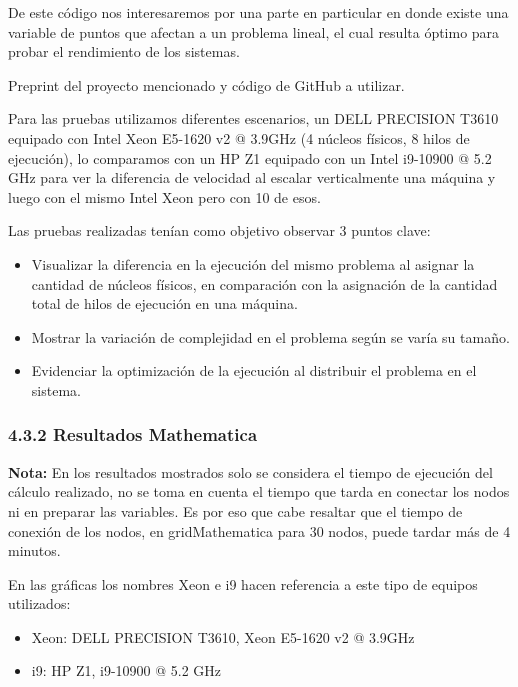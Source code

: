 \begin{spacing}{1.5}
  De este código nos interesaremos por una parte en particular en donde existe una variable de puntos que afectan a un problema lineal, el cual resulta óptimo para probar el rendimiento de los sistemas.

  Preprint del proyecto mencionado y código de GitHub a utilizar. \cite{preprint} \cite{git}

  Para las pruebas utilizamos diferentes escenarios, un DELL PRECISION T3610 equipado con Intel Xeon E5-1620 v2 @ 3.9GHz (4 núcleos físicos, 8 hilos de ejecución), lo comparamos con un HP Z1 equipado con un Intel i9-10900 @ 5.2 GHz para ver la diferencia de velocidad al escalar verticalmente una máquina y luego con el mismo Intel Xeon pero con 10 de esos.

  Las pruebas realizadas tenían como objetivo observar 3 puntos clave:

  \begin{itemize}
    \item Visualizar la diferencia en la ejecución del mismo problema al asignar la cantidad de núcleos físicos, en comparación con la asignación de la cantidad total de hilos de ejecución en una máquina.
    \item Mostrar la variación de complejidad en el problema según se varía su tamaño.
    \item Evidenciar la optimización de la ejecución al distribuir el problema en el sistema.
  \end{itemize}

  \subsubsection{4.3.2 Resultados Mathematica}

  \textbf{Nota:} En los resultados mostrados solo se considera el tiempo de ejecución del cálculo realizado, no se toma en cuenta el tiempo que tarda en conectar los nodos ni en preparar las variables. Es por eso que cabe resaltar que el tiempo de conexión de los nodos, en gridMathematica para 30 nodos, puede tardar más de 4 minutos.

  En las gráficas los nombres Xeon e i9 hacen referencia a este tipo de equipos utilizados:

  \begin{itemize}
    \item Xeon: DELL PRECISION T3610, Xeon E5-1620 v2 @ 3.9GHz
    \item i9: HP Z1, i9-10900 @ 5.2 GHz
  \end{itemize}


\end{spacing}
